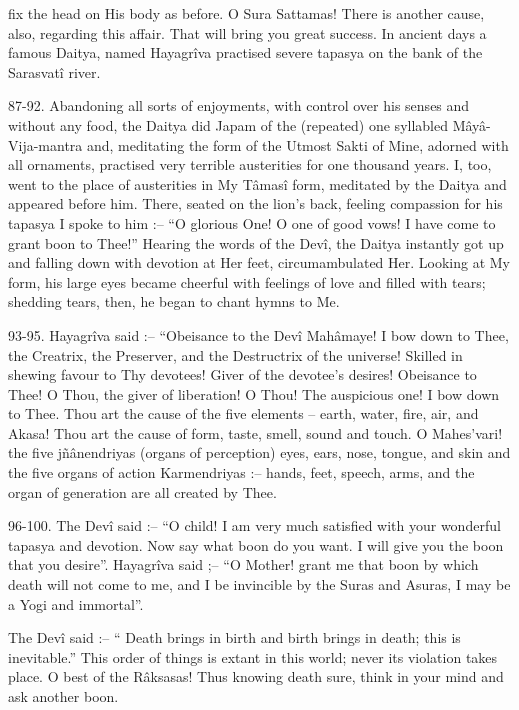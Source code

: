 fix the head on His body as before. O Sura Sattamas! There is another cause, also, regarding this affair. That will bring you great success. In ancient days a famous Daitya, named Hayagrîva practised severe tapasya on the bank of the Sarasvatî river.

 

87-92. Abandoning all sorts of enjoyments, with control over his senses and without any food, the Daitya did Japam of the (repeated) one syllabled Mâyâ-Vija-mantra and, meditating the form of the Utmost Sakti of Mine, adorned with all ornaments, practised very terrible austerities for one thousand years. I, too, went to the place of austerities in My Tâmasî form, meditated by the Daitya and appeared before him. There, seated on the lion's back, feeling compassion for his tapasya I spoke to him :-- “O glorious One! O one of good vows! I have come to grant boon to Thee!” Hearing the words of the Devî, the Daitya instantly got up and falling down with devotion at Her feet, circumambulated Her. Looking at My form, his large eyes became cheerful with feelings of love and filled with tears; shedding tears, then, he began to chant hymns to Me.

 

93-95. Hayagrîva said :-- “Obeisance to the Devî Mahâmaye! I bow down to Thee, the Creatrix, the Preserver, and the Destructrix of the universe! Skilled in shewing favour to Thy devotees! Giver of the devotee's desires! Obeisance to Thee! O Thou, the giver of liberation! O Thou! The auspicious one! I bow down to Thee. Thou art the cause of the five elements -- earth, water, fire, air, and Akasa! Thou art the cause of form, taste, smell, sound and touch. O Mahes’vari! the five jñânendriyas (organs of perception) eyes, ears, nose, tongue, and skin and the five organs of action Karmendriyas :-- hands, feet, speech, arms, and the organ of generation are all created by Thee.

 

96-100. The Devî said :-- “O child! I am very much satisfied with your wonderful tapasya and devotion. Now say what boon do you want. I will give you the boon that you desire”. Hayagrîva said ;-- “O Mother! grant me that boon by which death will not come to me, and I be invincible by the Suras and Asuras, I may be a Yogi and immortal”.

 

The Devî said :-- “ Death brings in birth and birth brings in death; this is inevitable.” This order of things is extant in this world; never its violation takes place. O best of the Râksasas! Thus knowing death sure, think in your mind and ask another boon.

